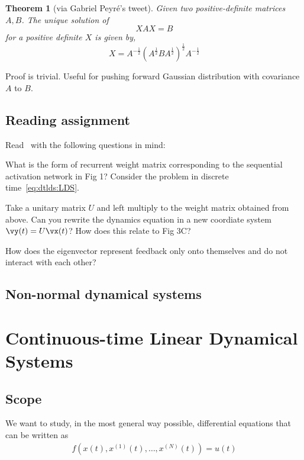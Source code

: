 \documentclass[a4paper,11pt]{exam}
\newtheorem{theorem}{Theorem}
\newcounter{ct}
\newcommand{\onehalf}{\frac{1}{2}}
\begin{document}
\begin{questions}
\begin{theorem}[via Gabriel Peyr\'e's tweet]
    Given two positive-definite matrices $A, B$. The unique solution of
    \[
	XAX=B
    \]
    for a positive definite $X$ is given by,
    \[
	X = A^{-\onehalf} \left( A^\onehalf B A^\onehalf \right)^\onehalf A^{-\onehalf}
    \]
\end{theorem}
Proof is trivial. Useful for pushing forward Gaussian distribution with covariance $A$ to $B$.

\subsection{Reading assignment}
Read~\citep{Goldman2009} with the following questions in mind:

\question What is the form of recurrent weight matrix corresponding to the sequential activation network in Fig 1? Consider the problem in discrete time~\eqref{eq:dtlds:LDS}.

\question Take a unitary matrix $U$ and left multiply to the weight matrix obtained from above. Can you rewrite the dynamics equation in a new coordiate system $\vy(t) = U\vx(t)$? How does this relate to Fig 3C?

\question How does the eigenvector represent feedback only onto themselves and do not interact with each other?

\subsection{Non-normal dynamical systems}

\section{Continuous-time Linear Dynamical Systems}
\subsection{Scope}
We want to study, in the most general way possible, differential equations that can be written as
\begin{align}
    f(x(t), x^{(1)}(t), \ldots, x^{(N)}(t)) = u(t)
\end{align}

\end{questions}
\end{document}
